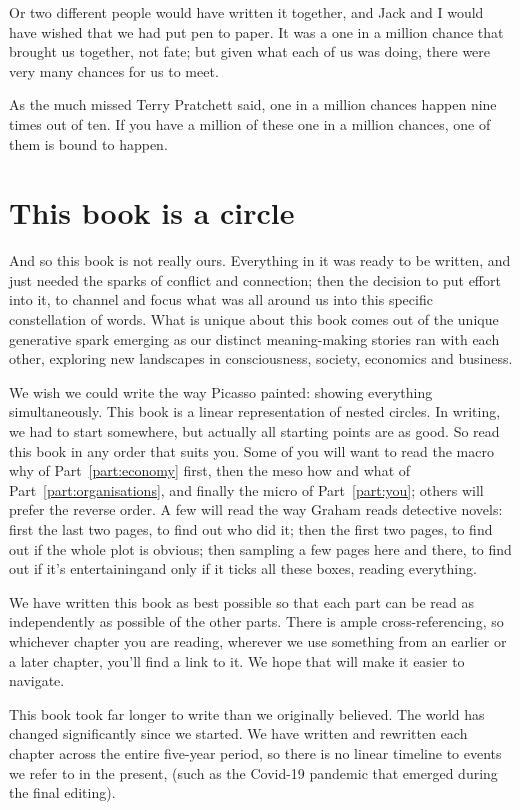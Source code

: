 Or two different people would have written it together, and Jack and I would have wished that we had put pen to paper. It was a one in a million chance that brought us together, not fate; but given what each of us was doing, there were very many chances for us to meet.


As the much missed Terry Pratchett said, one in a million chances happen nine times out of ten. If you have a million of these one in a million chances, one of them is bound to happen. 
\section*{This book is a circle}
And so this book is not really ours. Everything in it was ready to be written, and just needed the sparks of conflict and connection; then the decision to put effort into it, to channel and focus what was all around us into this specific constellation of words. What is unique about this book comes out of the unique generative spark emerging as our distinct meaning-making stories ran with each other, exploring new landscapes in consciousness, society, economics and business.


We wish we could write the way Picasso painted: showing everything simultaneously. This book is a linear representation of nested circles. In writing, we had to start somewhere, but actually all starting points are as good. So read this book in any order that suits you. Some of you will want to read the macro why of Part~\ref{part:economy} first, then the meso how and what of Part~\ref{part:organisations}, and finally the micro of Part~\ref{part:you}; others will prefer the reverse order. A few will read the way Graham reads detective novels: first the last two pages, to find out who did it; then the first two pages, to find out if the whole plot is obvious; then sampling a few pages here and there, to find out if it's entertaining\textemdash and only if it ticks all these boxes, reading  everything.


We have written this book as best possible so that each part can be read as independently as possible of the other parts. There is ample cross-referencing, so whichever chapter you are reading, wherever we use something from an earlier or a later chapter, you'll find a link to it. We hope that will make it easier to navigate.


This book took far longer to write than we originally believed. The world has changed significantly since we started. We have written and rewritten each chapter across the entire five-year period, so there is no linear timeline to events we refer to in the present, (such as the Covid-19 pandemic that emerged during the final editing).


